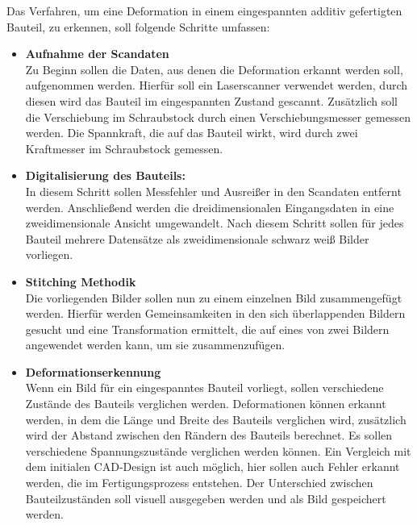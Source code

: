 Das Verfahren, um eine Deformation in einem eingespannten additiv gefertigten
Bauteil, zu erkennen, soll folgende Schritte umfassen:
\begin{itemize}
    \item \textbf{Aufnahme der Scandaten}\\
        Zu Beginn sollen die Daten, aus denen die Deformation erkannt werden soll, 
        aufgenommen werden. Hierfür soll ein Laserscanner verwendet werden, durch diesen wird 
        das Bauteil im eingespannten Zustand gescannt. Zusätzlich soll die 
        Verschiebung im Schraubstock durch einen Verschiebungsmesser gemessen werden.
        Die Spannkraft, die auf das Bauteil wirkt, wird durch zwei Kraftmesser im 
        Schraubstock gemessen.
    \item \textbf{Digitalisierung des Bauteils:}\\
        In diesem Schritt sollen Messfehler und Ausreißer
        in den Scandaten entfernt werden. Anschließend werden die dreidimensionalen 
        Eingangsdaten in eine zweidimensionale Ansicht umgewandelt.
        Nach diesem Schritt sollen für jedes Bauteil mehrere Datensätze als 
        zweidimensionale schwarz weiß Bilder vorliegen.
    \item \textbf{Stitching Methodik}\\
        Die vorliegenden Bilder sollen nun zu einem einzelnen Bild zusammengefügt werden.
        Hierfür werden Gemeinsamkeiten in den sich 
        überlappenden Bildern gesucht und eine Transformation ermittelt,
        die auf eines von zwei Bildern angewendet werden kann, um sie zusammenzufügen.
    \item \textbf{Deformationserkennung}\\
        Wenn ein Bild für ein eingespanntes Bauteil vorliegt, sollen verschiedene 
        Zustände des Bauteils verglichen werden. Deformationen können erkannt werden, in dem 
        die Länge und Breite des Bauteils verglichen wird, zusätzlich wird der 
        Abstand zwischen den Rändern des Bauteils berechnet. Es sollen verschiedene
        Spannungszustände verglichen werden können. Ein Vergleich mit dem initialen 
        CAD-Design ist auch möglich, hier sollen auch Fehler erkannt werden, die im 
        Fertigungsprozess entstehen. Der Unterschied zwischen Bauteilzuständen
        soll visuell ausgegeben werden und als Bild gespeichert werden.
        
\end{itemize}
























